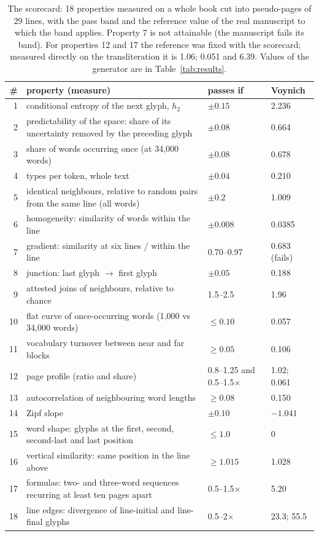 \begin{table}[htbp]
\centering\footnotesize
\caption{The scorecard: 18 properties measured on a whole book cut into pseudo-pages of 29 lines, with the pass band and
the reference value of the real manuscript to which the band applies. Property 7 is not attainable (the manuscript fails
its band). For properties 12 and 17 the reference was fixed with the scorecard; measured directly on the transliteration
it is 1.06; 0.051 and 6.39. Values of the generator
are in Table~\ref{tab:results}.}
\label{tab:scorecard}
\begin{tabularx}{\linewidth}{rYll}
\toprule
\# & property (measure) & passes if & Voynich \\
 & conditional entropy of the next glyph, $h_2$ & $\pm 0.15$ & 2.236 \\
2 & predictability of the space: share of its uncertainty removed by the preceding glyph & $\pm 0.08$ & 0.664 \\
3 & share of words occurring once (at 34{,}000 words) & $\pm 0.08$ & 0.678 \\
4 & types per token, whole text & $\pm 0.04$ & 0.210 \\
5 & identical neighbours, relative to random pairs from the same line (all words) & $\pm 0.2$ & 1.009 \\
6 & homogeneity: similarity of words within the line & $\pm 0.008$ & 0.0385 \\
7 & gradient: similarity at six lines / within the line & 0.70--0.97 & 0.683 (fails) \\
8 & junction: last glyph $\to$ first glyph & $\pm 0.05$ & 0.188 \\
9 & attested joins of neighbours, relative to chance & 1.5--2.5 & 1.96 \\
10 & flat curve of once-occurring words (1{,}000 vs 34{,}000 words) & $\le 0.10$ & 0.057 \\
11 & vocabulary turnover between near and far blocks & $\ge 0.05$ & 0.106 \\
12 & page profile (ratio and share) & 0.8--1.25 and 0.5--1.5$\times$ & 1.02; 0.061 \\
13 & autocorrelation of neighbouring word lengths & $\ge 0.08$ & 0.150 \\
14 & Zipf slope & $\pm 0.10$ & $-1.041$ \\
15 & word shape: glyphs at the first, second, second-last and last position & $\le 1.0$ & 0 \\
16 & vertical similarity: same position in the line above & $\ge 1.015$ & 1.028 \\
17 & formulas: two- and three-word sequences recurring at least ten pages apart & 0.5--1.5$\times$ & 5.20 \\
18 & line edges: divergence of line-initial and line-final glyphs & 0.5--2$\times$ & 23.3; 55.5 \\
\bottomrule
\end{tabularx}
\end{table}

